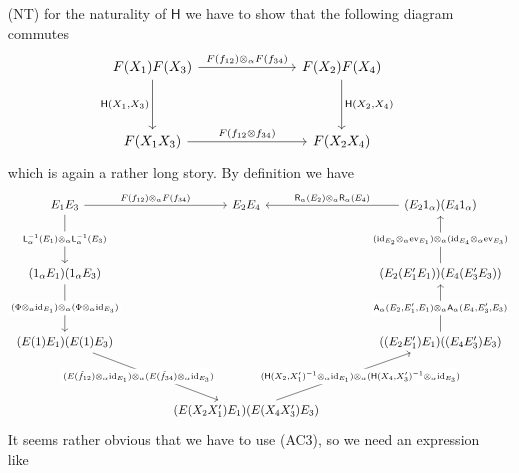 \begin{prf}[Sketch]
\begin{enumerate}
\item[(NT)]
for the naturality of $\mathsf{H}$ we have to show that the following diagram commutes
\begin{equation*}
\begin{tikzcd}[row sep=3.6em,column sep=7em]
  F(X_{1}) F(X_{3})
  \ar{r}{F(f_{12}) \otimes_{\alpha} F(f_{34})}
  \ar{d}[swap]{\mathsf{H}(X_{1},X_{3})}
  &
  F(X_{2}) F(X_{4})
  \ar{d}{\mathsf{H}(X_{2},X_{4})}
  \\
  F(X_{1} X_{3})
  \ar{r}{F(f_{12} \otimes f_{34})}
  &
  F(X_{2} X_{4})
\end{tikzcd}
\end{equation*}
which is again a rather long story.
\newpage
By definition we have
\begin{equation*}
\begin{tikzcd}[row sep=4em,column sep=4.2em]
  E_{1} E_{3}
  \ar{r}{F(f_{12}) \otimes_{\alpha} F(f_{34})}
  \ar{d}[description]{\mathsf{L}_{\alpha}^{-1}(E_{1}) \otimes_{\alpha} \mathsf{L}_{\alpha}^{-1}(E_{3})}
  &
  E_{2} E_{4}
  &
  (E_{2} 1_{\alpha}) (E_{4} 1_{\alpha})
  \ar{l}[swap]{\mathsf{R}_{\alpha}(E_{2}) \otimes_{\alpha} \mathsf{R}_{\alpha}(E_{4})}
  \\
  (1_{\alpha} E_{1}) (1_{\alpha} E_{3})
  \ar{d}[description]{(\Phi \otimes_{\alpha} \mathrm{id}_{E_{1}}) \otimes_{\alpha} (\Phi \otimes_{\alpha} \mathrm{id}_{E_{3}})}
  &
  &
  (E_{2} (E_{1}^{\prime} E_{1})) (E_{4} (E_{3}^{\prime} E_{3}))
  \ar{u}[description]{(\mathrm{id}_{E_{2}} \otimes_{\alpha} \mathrm{ev}_{E_{1}}) \otimes_{\alpha} (\mathrm{id}_{E_{4}} \otimes_{\alpha} \mathrm{ev}_{E_{3}})}
  \\
  (E(1) E_{1}) (E(1) E_{3})
  \ar{rd}[description,xshift=-5mm]{(E(\tilde{f}_{12}) \otimes_{\alpha} \mathrm{id}_{E_{1}}) \otimes_{\alpha} (E(\tilde{f}_{34}) \otimes_{\alpha} \mathrm{id}_{E_{3}})}
  &
  &
  ((E_{2} E_{1}^{\prime}) E_{1}) ((E_{4} E_{3}^{\prime}) E_{3})
  \ar{u}[description]{\mathsf{A}_{\alpha}(E_{2},E_{1}^{\prime},E_{1}) \otimes_{\alpha} \mathsf{A}_{\alpha}(E_{4},E_{3}^{\prime},E_{3})}
  \\
  &
  (E(X_{2} X_{1}^{\prime}) E_{1}) (E(X_{4} X_{3}^{\prime}) E_{3})
  \ar{ur}[description,xshift=5mm]{(\mathsf{H}(X_{2},X_{1}^{\prime})^{-1} \otimes_{\alpha} \mathrm{id}_{E_{1}}) \otimes_{\alpha} (\mathsf{H}(X_{4},X_{3}^{\prime})^{-1} \otimes_{\alpha} \mathrm{id}_{E_{3}})}
  &
\end{tikzcd}
\end{equation*}
It seems rather obvious that we have to use (AC3), so we need an expression like

\end{enumerate}
\end{prf}
